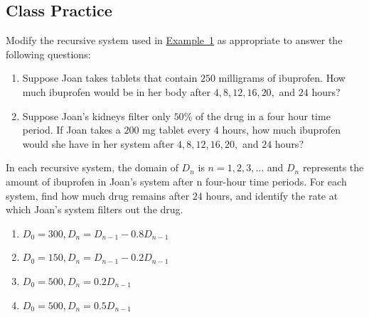 \documentclass[10pt,]{book}
\theoremstyle{ptxdefinitionnotitle}
\theoremstyle{ptxdefinitiontitle}
\theoremstyle{ptxdefinitionnotitle}
\theoremstyle{ptxdefinitiontitle}
\theoremstyle{ptxdefinitionnotitle}
\theoremstyle{ptxdefinitiontitle}
\numberwithin{equation}{section}
\begin{document}
\subsection[{Class Practice}]{Class Practice}\label{exercises-1}
\begin{divisionexercise}{1}\hypertarget{chapter04-section01-initial-ibuprofen-exercise}{}
\hypertarget{p-14}{}%
Modify the recursive system used in \hyperref[ibuprofen-example-one-dose]{Example~1} as appropriate to answer the following questions: \leavevmode%
\begin{enumerate}[label=(\alph*)]
\item\hypertarget{li-1}{}Suppose Joan takes tablets that contain \(250\) milligrams of ibuprofen. How much ibuprofen would be in her body after \(4, 8, 12, 16, 20,\) and \(24\) hours?%
\item\hypertarget{li-2}{}Suppose Joan's kidneys filter only \(50\%\) of the drug in a four hour time period.  If Joan takes a \(200\) mg tablet every \(4\) hours, how much ibuprofen would she have in her system after \(4, 8, 12, 16, 20,\) and \(24\) hours?%
\end{enumerate}
%
\end{divisionexercise}%
\begin{divisionexercise}{2}\hypertarget{exercise-2}{}
\hypertarget{p-15}{}%
In each recursive system, the domain of \(D_n\) is \(n=1,2,3, ...\) and \(D_n\) represents the amount of ibuprofen in Joan's system after n four-hour time periods.  For each system, find how much drug remains after \(24\) hours, and identify the rate at which Joan's system filters out the drug. \leavevmode%
\begin{enumerate}[label=(\alph*)]
\item\hypertarget{li-3}{}\(D_0=300, D_n=D_{n-1} - 0.8D_{n-1}\)%
\item\hypertarget{li-4}{}\(D_0=150, D_n=D_{n-1} - 0.2D_{n-1}\)%
\item\hypertarget{li-5}{}\(D_0=500, D_n=0.2D_{n-1}\)%
\item\hypertarget{li-6}{}\(D_0=500, D_n=0.5D_{n-1}\)%
\end{enumerate}
%
\end{divisionexercise}%
\end{document}
